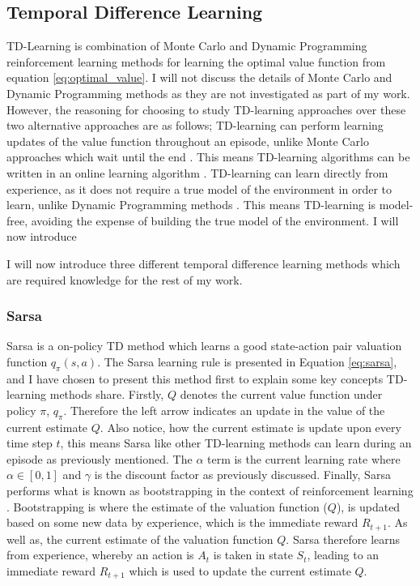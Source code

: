 \documentclass[../dissertation.tex]{subfiles}
\begin{document}
\subsection{Temporal Difference Learning}
\label{sec:td_learning}

TD-Learning is combination of Monte Carlo and Dynamic Programming reinforcement learning methods for learning the optimal value function from equation \ref{eq:optimal_value}. I will not discuss the details of Monte Carlo and Dynamic Programming methods as they are not investigated as part of my work. However, the reasoning for choosing to study  TD-learning approaches over these two alternative approaches are as follows; TD-learning can perform learning updates of the value function throughout an episode, unlike Monte Carlo approaches which wait until the end \cite{model_free_prediction}. This means TD-learning algorithms can be written in an online learning algorithm \cite{sutton2011reinforcement}. TD-learning can learn directly from experience, as it does not require a true model of the environment in order to learn, unlike Dynamic Programming methods \cite{mdp_dynamic_prog}. This means TD-learning is model-free, avoiding the expense of building the true model of the environment. I will now introduce

I will now introduce three different temporal difference learning methods which are required knowledge for the rest of my work.

\subsubsection*{Sarsa}

Sarsa is a on-policy TD method which learns a good state-action pair valuation function $q_\pi(s,a)$. The Sarsa learning rule is presented in Equation \ref{eq:sarsa}, and I have chosen to present this method first to explain some key concepts TD-learning methods share. Firstly, $Q$ denotes the current value function under policy $\pi$, $q_\pi$. Therefore the left arrow indicates an update in the value of the current estimate $Q$. Also notice, how the current estimate is update upon every time step $t$, this means Sarsa like other TD-learning methods can learn during an episode as previously mentioned. The $\alpha$ term is the current learning rate where $\alpha \in [0,1]$ and $\gamma$ is the discount factor as previously discussed. Finally, Sarsa performs what is known as bootstrapping in the context of reinforcement learning \cite{sutton2011reinforcement}. Bootstrapping is where the  estimate of the valuation function ($Q$), is updated based on some new data by experience, which is the immediate reward $R_{t+1}$. As well as, the current estimate of the valuation function $Q$. Sarsa therefore learns from experience, whereby an action is $A_t$ is taken in state $S_{t}$, leading to an immediate reward $R_{t+1}$ which is used to update the current estimate $Q$.
\end{document}
